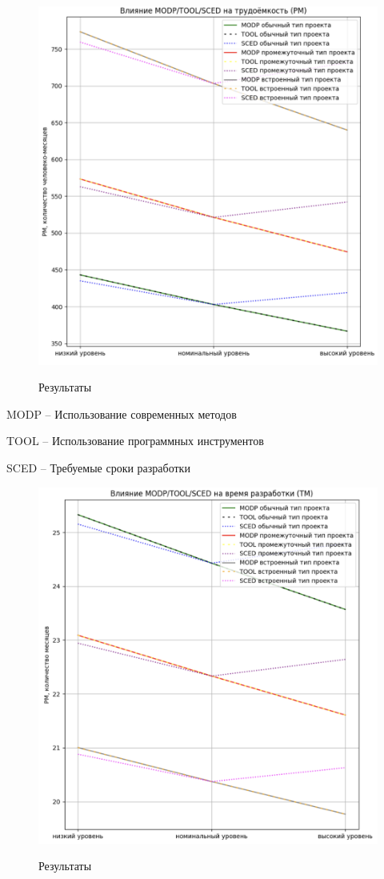 \begin{figure}[ht!]
	\includegraphics[width=0.75\linewidth]{assets/images/Влияние фвофажфда.png}
	\label{fig:r2}
	\caption{Результаты}
\end{figure}
\FloatBarrier

MODP – Использование современных методов

TOOL – Использование программных инструментов

SCED – Требуемые сроки разработки

\begin{figure}[ht!]
	\includegraphics[width=0.75\linewidth]{assets/images/2.2 Влияние.png}
	\label{fig:r2}
	\caption{Результаты}
\end{figure}
\FloatBarrier

